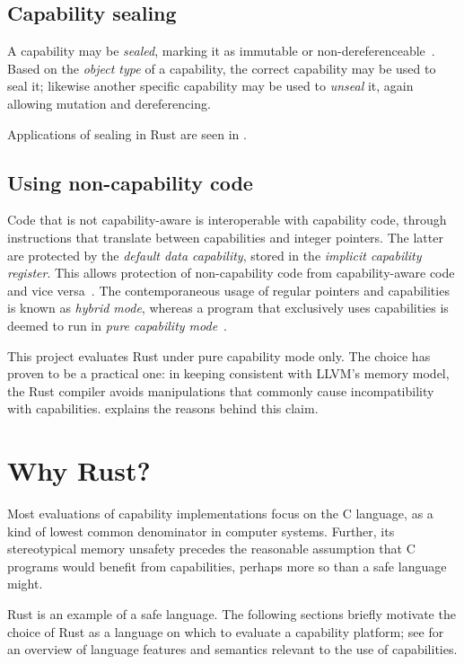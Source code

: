 \documentclass[dissertation.tex]{subfiles}
\begin{document}
\subsection{Capability sealing}
\label{sec:bg-cheri-sealing}
A capability may be \emph{sealed}, marking it as immutable or
non-dereferenceable~\cite{cheri-v6}.
Based on the \emph{object type} of a capability, the correct capability
may be used to seal it; likewise another specific capability may be used
to \emph{unseal} it, again allowing mutation and dereferencing.

Applications of sealing in Rust are seen in
.


\subsection{Using non-capability code}
Code that is not capability-aware is interoperable with capability code,
through instructions that translate between capabilities and integer
pointers.
The latter are protected by the \emph{default data capability}, stored
in the \emph{implicit capability register}.
This allows protection of non-capability code from capability-aware code
and vice versa~\cite{cheri-risc-2014}.
The contemporaneous usage of regular pointers and capabilities is known
as \emph{hybrid mode}, whereas a program that exclusively uses
capabilities is deemed to run in \emph{pure capability
mode}~\cite{cheri-prog-guide}.

This project evaluates Rust under pure capability mode only.
The choice has proven to be a practical one: in keeping consistent with
LLVM's memory model, the Rust compiler avoids manipulations that
commonly cause incompatibility with capabilities.
 explains the reasons behind this claim.


\section{Why Rust?}
\label{sec:bg-why-rust}

Most evaluations of capability implementations focus on the C language,
as a kind of lowest common denominator in computer systems.
Further, its stereotypical memory unsafety precedes the reasonable
assumption that C programs would benefit from capabilities, perhaps more
so than a safe language might.

Rust is an example of a safe language.
The following sections briefly motivate the choice of Rust as a language
on which to evaluate a capability platform;
see  for an overview of language features and semantics
relevant to the use of capabilities.
\end{document}
